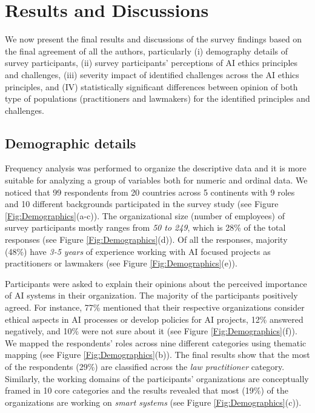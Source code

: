 \section{Results and Discussions}\label{sec:Results}
We now present the final results and discussions of the survey findings based on the final agreement of all the authors, particularly (i)  demography details of survey participants, (ii)  survey participants’ perceptions of AI ethics principles and challenges, (iii)  severity impact of identified challenges across the AI ethics principles, and (IV) statistically significant differences between opinion of both type of populations (practitioners and lawmakers) for the identified principles and challenges.

\subsection{Demographic details}\label{sec:demographic}
Frequency analysis was performed to organize the descriptive data and it is more suitable for analyzing a group of variables both for numeric and ordinal data. We noticed that 99 respondents from 20 countries across 5 continents with 9 roles and 10 different backgrounds participated in the survey study (see Figure \ref{Fig:Demographics}(a-c)). The organizational size (number of employees) of survey participants mostly ranges from \textit{50 to 249}, which is 28\% of the total responses (see Figure \ref{Fig:Demographics}(d)). Of all the responses, majority (48\%) have \textit{3-5 years} of experience working with AI focused projects as practitioners or lawmakers (see Figure \ref{Fig:Demographics}(e)). 

Participants were asked to explain their opinions about the perceived importance of AI systems in their organization. The majority of the participants positively agreed. For instance, 77\% mentioned that their respective organizations consider ethical aspects in AI processes or develop policies for AI projects, 12\% answered negatively, and 10\% were not sure about it (see Figure \ref{Fig:Demographics}(f)). We mapped the respondents’ roles across nine different categories using thematic mapping (see Figure \ref{Fig:Demographics}(b)). The final results show that the most of the respondents (29\%) are classified across the \textit{law practitioner} category. Similarly, the working domains of the participants’ organizations are conceptually framed in 10 core categories and the results revealed that most (19\%) of the organizations are working on \textit{smart systems} (see Figure \ref{Fig:Demographics}(c)).

